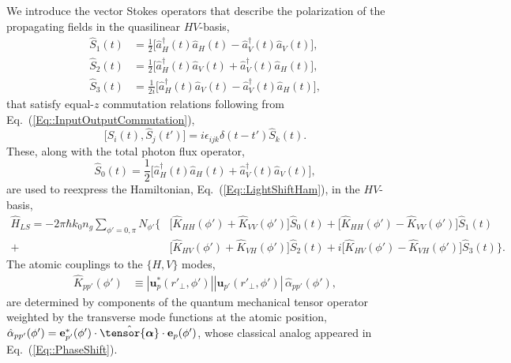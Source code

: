 \documentclass[preprint, aps,pra,onecolumn]{revtex4-1} %
\newcommand{\erf}[1]{Eq.~(\ref{#1})}
\newcommand{\smallfrac}[2]{\mbox{$\frac{#1}{#2}$}}
\newcommand{\poltens}{\hat{\tensor{\boldsymbol{\alpha}}}}
\newcommand{\polcomp}{\hat{K}} %
\begin{document}
We introduce the vector Stokes operators that describe the polarization of the propagating fields in the quasilinear $HV$-basis,
\begin{subequations}\label{Eq::StokesComponents}
	\begin{align} 
		\hat{S}_1(t) & = \smallfrac{1}{2}\big[ \hat{a}^\dag_H(t) \hat{a}_H(t)-\hat{a}^\dag_V(t) \hat{a}_V(t) \big], \\
	 	\hat{S}_2(t) & = \smallfrac{1}{2}\big[ \hat{a}^\dag_H(t) \hat{a}_V(t)+\hat{a}^\dag_V(t) \hat{a}_H(t) \big], \\ 
		\hat{S}_3(t) & = \smallfrac{1}{2i}\big[ \hat{a}^\dag_H(t) \hat{a}_V(t) -\hat{a}^\dag_V(t) \hat{a}_H(t) \big],
	\end{align}
\end{subequations}
that satisfy equal-$z$ commutation relations following from \erf{Eq::InputOutputCommutation},
	\begin{equation} \label{Eq::StokesCommutation}
		\big[\hat{S}_i(t), \hat{S}_j(t')\big] =i \epsilon_{ijk} \delta(t-t')  \hat{S}_k(t).
	\end{equation}
These, along with the total photon flux operator,
	\begin{equation}
		\hat{S}_0(t) = \smallfrac{1}{2}\big[ \hat{a}^\dag_H(t) \hat{a}_H(t)+\hat{a}^\dag_V(t) \hat{a}_V(t) \big],
	\end{equation}
are used to reexpress the Hamiltonian, \erf{Eq::LightShiftHam}, in the $HV$-basis,
	\begin{align}  
		\hat{H}_{LS} 	= - 2 \pi \hbar k_0 n_g \sum_{\phi'=0,\pi}N_{\phi'} \Big\{ &\big[ \polcomp_{HH}(\phi')+\polcomp_{VV}(\phi') \big] \hat{S}_0(t) +  \big[\polcomp_{HH}(\phi')  - \polcomp_{VV}(\phi')  \big] \hat{S}_1(t)  \label{Eq::GenHamiltonian}  \\
+ &\big[\polcomp_{HV}(\phi') + \polcomp_{VH}(\phi')  \big] \hat{S}_2(t) + i  \big[ \polcomp_{HV}(\phi')-\polcomp_{VH}(\phi') \big]\hat{S}_3(t) \Big\}. \nonumber
	\end{align}
The atomic couplings to the $\{H,V\}$ modes,
	\begin{align} 
		\polcomp_{p p'}(\phi') & \equiv |\mathbf{u}^*_p(r'_\perp, \phi')||\mathbf{u}_{p'}(r'_\perp, \phi')| \, \hat{\alpha}_{p p'}(\phi') , 
	\end{align}
are determined by components of the quantum mechanical tensor operator weighted by the transverse mode functions at the atomic position, $\hat{\alpha}_{p p'}(\phi') = \mathbf{e}^*_{p'}(\phi') \cdot \poltens \cdot \mathbf{e}_{p}(\phi') $, whose classical analog appeared in \erf{Eq::PhaseShift}.
\end{document}
